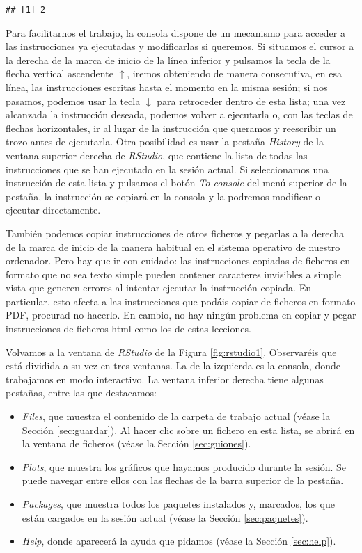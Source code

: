 \documentclass[]{book}
\providecommand{\tightlist}{%
  \setlength{\itemsep}{0pt}\setlength{\parskip}{0pt}}
\theoremstyle{definition}
\theoremstyle{definition}
\theoremstyle{definition}
\theoremstyle{remark}
\begin{document}
\begin{verbatim}
## [1] 2
\end{verbatim}

Para facilitarnos el trabajo, la consola dispone de un mecanismo para acceder a las instrucciones ya ejecutadas y modificarlas si queremos. Si situamos el cursor a la derecha de la marca de inicio de la línea inferior y pulsamos la tecla de la flecha vertical ascendente \(\uparrow\), iremos obteniendo de manera consecutiva, en esa línea, las instrucciones escritas hasta el momento en la misma sesión; si nos pasamos, podemos usar la tecla \(\downarrow\) para retroceder dentro de esta lista; una vez alcanzada la instrucción deseada, podemos volver a ejecutarla o, con las teclas de flechas horizontales, ir al lugar de la instrucción que queramos y reescribir un trozo antes de ejecutarla. Otra posibilidad es usar la pestaña \emph{History} de la ventana superior derecha de \emph{RStudio}, que contiene la lista de todas las instrucciones que se han ejecutado en la sesión actual. Si seleccionamos una instrucción de esta lista y pulsamos el botón \emph{To console} del menú superior de la pestaña, la instrucción se copiará en la consola y la podremos modificar o ejecutar directamente.

También podemos copiar instrucciones de otros ficheros y pegarlas a la derecha de la marca de inicio de la manera habitual en el sistema operativo de nuestro ordenador. Pero hay que ir con cuidado: las instrucciones copiadas de ficheros en formato que no sea texto simple pueden contener caracteres invisibles a simple vista que generen errores al intentar ejecutar la instrucción copiada. En particular, esto afecta a las instrucciones que podáis copiar de ficheros en formato PDF, procurad no hacerlo. En cambio, no hay ningún problema en copiar y pegar instrucciones de ficheros html como los de estas lecciones.

Volvamos a la ventana de \emph{RStudio} de la Figura \ref{fig:rstudio1}. Observaréis que está dividida a su vez en tres ventanas. La de la izquierda es la consola, donde trabajamos en modo interactivo. La ventana inferior derecha tiene algunas pestañas, entre las que destacamos:

\begin{itemize}
\tightlist
\item
  \emph{Files}, que muestra el contenido de la carpeta de trabajo actual (véase la Sección \ref{sec:guardar}). Al hacer clic sobre un fichero en esta lista, se abrirá en la ventana de ficheros (véase la Sección \ref{sec:guiones}).
\item
  \emph{Plots}, que muestra los gráficos que hayamos producido durante la sesión. Se puede navegar entre ellos con las flechas de la barra superior de la pestaña.
\item
  \emph{Packages}, que muestra todos los paquetes instalados y, marcados, los que están cargados en la sesión actual (véase la Sección \ref{sec:paquetes}).
\item
  \emph{Help}, donde aparecerá la ayuda que pidamos (véase la Sección \ref{sec:help}).
\end{itemize}
\end{document}
